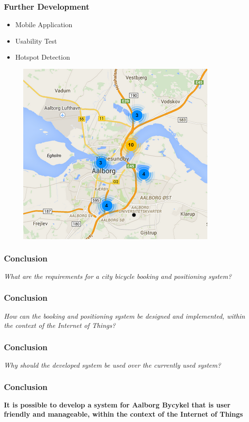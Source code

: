 \begin{frame}
\frametitle{Further Development}
\begin{itemize}
	\item Mobile Application
	\item Usability Test
	\item Hotspot Detection
\end{itemize}
\begin{figure}
\centering
\includegraphics[scale=0.5]{MarkerClusterer}
\end{figure}
\end{frame}

\begin{frame}
\frametitle{Conclusion}
\begin{center}
	\textit{What are the requirements for a city bicycle booking and positioning system?}
\end{center}
\end{frame}

\begin{frame}
	\frametitle{Conclusion}
	\begin{center}
		\textit{How can the booking and positioning system be designed and implemented, within the context of the Internet of Things?}
	\end{center}
\end{frame}

\begin{frame}
	\frametitle{Conclusion}
	\begin{center}
		\textit{Why should the developed system be used over the currently used system?}
	\end{center}
\end{frame}

\begin{frame}
	\frametitle{Conclusion}
	\begin{center}
		\textbf{It is possible to develop a system for Aalborg Bycykel that is user friendly and manageable, within the context of the Internet of Things}
	\end{center}
\end{frame}